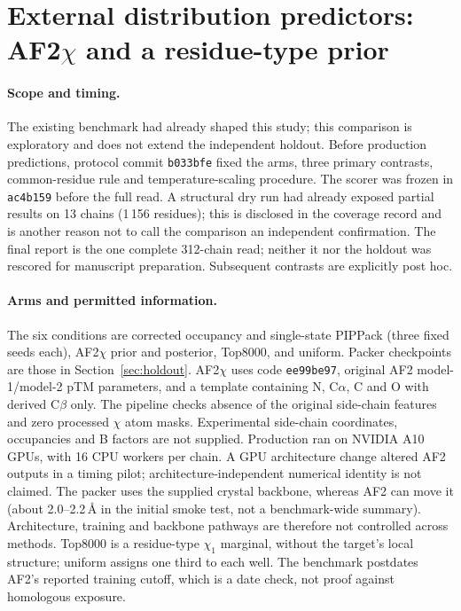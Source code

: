 \documentclass[10pt,a4paper]{article}
\begin{document}

\FloatBarrier

\section{External distribution predictors: AF2$\chi$ and a residue-type prior}
\label{sec:afcomparison}

\paragraph{Scope and timing.} The existing benchmark had already shaped this study;
this comparison is exploratory and does not extend the independent holdout. Before
production predictions, protocol commit \texttt{b033bfe} fixed the arms, three primary
contrasts, common-residue rule and temperature-scaling procedure. The scorer was frozen in
\texttt{ac4b159} before the full read. A structural dry run had already exposed partial
results on 13 chains (1\,156 residues); this is disclosed in the coverage record and is
another reason not to call the comparison an independent confirmation. The final
report is the one complete 312-chain read; neither it nor the holdout was rescored
for manuscript preparation. Subsequent contrasts are explicitly post hoc.

\paragraph{Arms and permitted information.} The six conditions are corrected occupancy
and single-state PIPPack (three fixed seeds each), AF2$\chi$ prior and posterior,
Top8000, and uniform. Packer checkpoints are those in Section~\ref{sec:holdout}.
AF2$\chi$ uses code \texttt{ee99be97}, original AF2 model-1/model-2 pTM parameters,
and a template containing N, C$\alpha$, C and O with derived C$\beta$ only. The pipeline
checks absence of the original side-chain features and zero processed $\chi$ atom
masks. Experimental side-chain coordinates, occupancies and B factors are not supplied.
Production ran on NVIDIA A10 GPUs, with 16 CPU workers per chain. A GPU architecture
change altered AF2 outputs in a timing pilot; architecture-independent numerical
identity is not claimed. The packer uses the supplied crystal backbone, whereas AF2
can move it (about 2.0--2.2\,\AA{} in the initial smoke test, not a benchmark-wide
summary). Architecture, training and backbone pathways are therefore not controlled
across methods. Top8000 is a residue-type $\chi_1$ marginal, without the target's local
structure; uniform assigns one third to each well. The benchmark postdates AF2's
reported training cutoff, which is a date check, not proof against homologous exposure.
\end{document}
